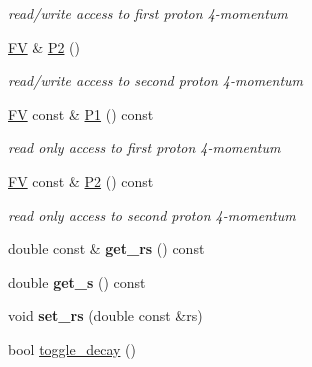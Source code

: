 \begin{DoxyCompactItemize}
\begin{DoxyCompactList}\small\item\em read/write access to first proton 4-\/momentum \end{DoxyCompactList}\item 
\hypertarget{classPS__2_a67fac165db2b49e4469787c6df78cb62}{}\hyperlink{classFV}{F\+V} \& \hyperlink{classPS__2_a67fac165db2b49e4469787c6df78cb62}{P2} ()\label{classPS__2_a67fac165db2b49e4469787c6df78cb62}

\begin{DoxyCompactList}\small\item\em read/write access to second proton 4-\/momentum \end{DoxyCompactList}\item 
\hypertarget{classPS__2_a772e6e3ed309f0afd1a4676b5cd2df92}{}\hyperlink{classFV}{F\+V} const \& \hyperlink{classPS__2_a772e6e3ed309f0afd1a4676b5cd2df92}{P1} () const \label{classPS__2_a772e6e3ed309f0afd1a4676b5cd2df92}

\begin{DoxyCompactList}\small\item\em read only access to first proton 4-\/momentum \end{DoxyCompactList}\item 
\hypertarget{classPS__2_aa9edfae86df81b545e27926fe7318e3e}{}\hyperlink{classFV}{F\+V} const \& \hyperlink{classPS__2_aa9edfae86df81b545e27926fe7318e3e}{P2} () const \label{classPS__2_aa9edfae86df81b545e27926fe7318e3e}

\begin{DoxyCompactList}\small\item\em read only access to second proton 4-\/momentum \end{DoxyCompactList}\item 
\hypertarget{classPS__2_a77b7be40d4f31c23a0bb0c112669c637}{}double const \& {\bfseries get\+\_\+rs} () const \label{classPS__2_a77b7be40d4f31c23a0bb0c112669c637}

\item 
\hypertarget{classPS__2_a3ef9ac96876f61f0c6a46a5321107bee}{}double {\bfseries get\+\_\+s} () const \label{classPS__2_a3ef9ac96876f61f0c6a46a5321107bee}

\item 
\hypertarget{classPS__2_a3b361fd3b41b8b92ab98e44dee130af8}{}void {\bfseries set\+\_\+rs} (double const \&rs)\label{classPS__2_a3b361fd3b41b8b92ab98e44dee130af8}

\item 
\hypertarget{classPS__2_a5063384c1c8b5e500f33970c01712f59}{}bool \hyperlink{classPS__2_a5063384c1c8b5e500f33970c01712f59}{toggle\+\_\+decay} ()\label{classPS__2_a5063384c1c8b5e500f33970c01712f59}


\end{DoxyCompactItemize}
